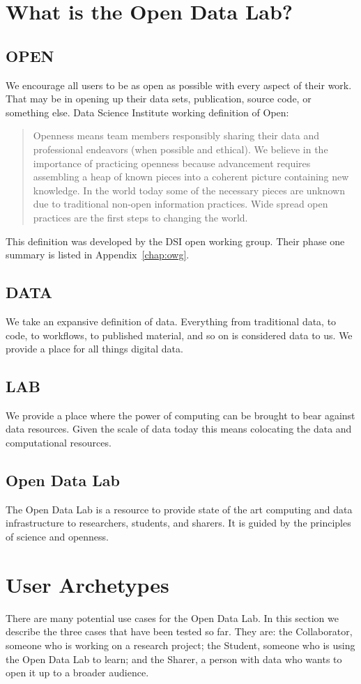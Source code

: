 \section{What is the Open Data Lab?}
\subsection*{OPEN}
We encourage all users to be as open as possible with every aspect of their work. That may be in opening up their data sets, publication, source code, or something else.
Data Science Institute working definition of Open:
\begin{quote}
Openness means team members responsibly sharing their data and professional endeavors (when possible and ethical). We believe in the importance of practicing openness because advancement requires assembling a heap of known pieces into a coherent picture containing new knowledge. In the world today some of the necessary pieces are unknown due to traditional non-open information practices. Wide spread open practices are the first steps to changing the world.
\end{quote}

This definition was developed by the DSI open working group. Their phase one summary is listed in Appendix~\ref{chap:owg}.

\subsection*{DATA}
We take an expansive definition of data. Everything from traditional data, to code, to workflows, to published material, and so on is considered data to us. We provide a place for all things digital data.
\subsection*{LAB}
We provide a place where the power of computing can be brought to bear against data resources. Given the scale of data today this means colocating the data and computational resources.
\subsection*{Open Data Lab}
The Open Data Lab is a resource to provide state of the art computing and data infrastructure to researchers, students, and sharers. It is guided by the principles of science and openness.
 
\section{User Archetypes}
\label{sec:archetypes}
There are many potential use cases for the Open Data Lab. In this section we describe the three cases that have been tested so far. They are: the Collaborator, someone who is working on a research project; the Student, someone who is using the Open Data Lab to learn; and the Sharer, a person with data who wants to open it up to a broader audience.

